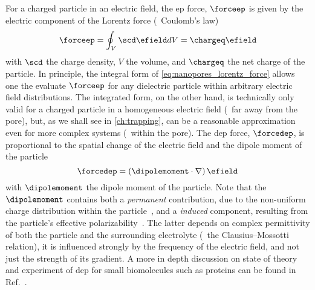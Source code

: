 For a charged particle in an electric field, the \gls{ep} force, $\forceep$ is given by the electric component
of the Lorentz force (\ie~Coulomb's law)~\cite{Lu-2012}
%
\begin{equation}\label{eq:nanopores_lorentz_force}
  \forceep = \oint_{V} \scd \efield dV = \chargeq \efield 
\end{equation}
%
with $\scd$ the charge density, $V$ the volume, and $\chargeq$ the net charge of the particle. In principle,
the integral form of \cref{eq:nanopores_lorentz_force} allows one the evaluate $\forceep$ for any dielectric
particle within arbitrary electric field distributions. The integrated form, on the other hand, is technically
only valid for a charged particle in a homogeneous electric field (\ie~far away from the pore), but, as we
shall see in \cref{ch:trapping}, can be a reasonable approximation even for more complex systems (\ie~within
the pore). The \gls{dep} force, $\forcedep$, is proportional to the spatial change of the electric field and
the dipole moment of the particle~\cite{Hoelzel-2020}
%
\begin{equation}\label{eq:nanopores_dep_force}
  \forcedep = \left( \dipolemoment \cdot \nabla \right) \efield 
\end{equation}
%
with $\dipolemoment$ the dipole moment of the particle. Note that the $\dipolemoment$ contains both a
\emph{permanent} contribution, due to the non-uniform charge distribution within the
particle~\cite{Hoelzel-2020,VanMeervelt-2017}, and a \emph{induced} component, resulting from the particle's
effective polarizability~\cite{Minerick-2015}. The latter depends on complex permittivity of both the particle
and the surrounding electrolyte (\ie~the Clausius--Mossotti relation), it is influenced strongly by the
frequency of the electric field, and not just the strength of its gradient. A more in depth discussion on
state of theory and experiment of \gls{dep} for small biomolecules such as proteins can be found in
Ref.~\cite{Hoelzel-2020}.

